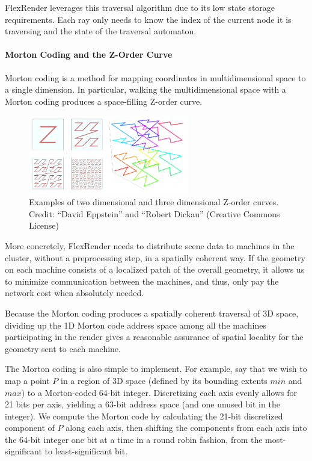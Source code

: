 \documentclass[a4paper,twoside]{article}
\begin{document}
FlexRender leverages this traversal algorithm due to its low state storage
requirements. Each ray only needs to know the index of the current node it is
traversing and the state of the traversal automaton.

\paragraph{Morton Coding and the Z-Order Curve}
Morton coding is a method for mapping coordinates in multidimensional space to
a single dimension. In particular, walking the multidimensional space with a
Morton coding produces a space-filling Z-order curve.

\begin{figure}[h!]
    \centering
    \includegraphics[width=70mm]{figures/zorder.png}
    \caption{Examples of two dimensional and three dimensional Z-order curves. Credit: ``David Eppstein'' and ``Robert Dickau'' (Creative Commons License)}
    \label{fig:zorder}
\end{figure}

More concretely, FlexRender needs to distribute scene data to machines in the
cluster, without a preprocessing step, in a spatially coherent way. If the
geometry on each machine consists of a localized patch of the overall geometry,
it allows us to minimize communication between the machines, and thus, only pay
the network cost when absolutely needed.

Because the Morton coding produces a spatially coherent traversal of 3D space,
dividing up the 1D Morton code address space among all the machines participating
in the render gives a reasonable assurance of spatial locality for the geometry
sent to each machine.

The Morton coding is also simple to implement. For example, say that we wish to
map a point $P$ in a region of 3D space (defined by its bounding extents
$min$ and $max$) to a Morton-coded 64-bit integer. Discretizing each axis evenly
allows for 21 bits per axis, yielding a 63-bit address space (and one unused bit
in the integer). We compute the Morton code by calculating the 21-bit
discretized component of $P$ along each axis, then shifting the components from
each axis into the 64-bit integer one bit at a time in a round robin fashion, from the
most-significant to least-significant bit.
\end{document}
